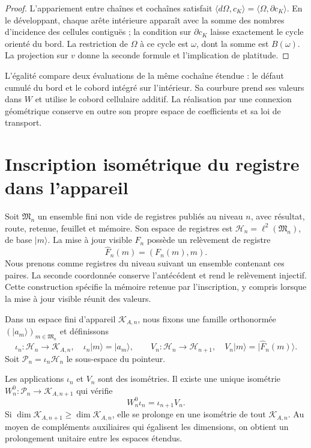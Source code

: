 \begin{proof}
L'appariement entre chaînes et cochaînes satisfait
\(\langle d\Omega,c_K\rangle=\langle\Omega,\partial c_K\rangle\).
En le développant, chaque arête intérieure apparaît avec la somme des nombres
d'incidence des cellules contiguës ; la condition sur
\(\partial c_K\) laisse exactement le cycle orienté du bord.
La restriction de \(\Omega\) à ce cycle est \(\omega\), dont la somme
est \(B(\omega)\). La projection sur \(v\) donne la seconde formule
et l'implication de platitude.
\end{proof}

L'égalité compare deux évaluations de la même cochaîne étendue : le défaut cumulé du bord et le cobord intégré sur l'intérieur. Sa courbure prend ses valeurs dans \(W\) et utilise le cobord cellulaire additif. La réalisation par une connexion géométrique conserve en outre son propre espace de coefficients et sa loi de transport.

\section{Inscription isométrique du registre dans l'appareil}
\label{x_reciprocidad:vii:sec:observador-aparato}

Soit \(\mathfrak M_n\) un ensemble fini non vide de registres
publiés au niveau \(n\), avec résultat, route, retenue, feuillet et mémoire.
Son espace de registres est
\(\mathcal H_n=\ell^2(\mathfrak M_n)\), de base \(|m\rangle\).
La mise à jour visible \(F_n\) possède un relèvement de registre
\[
 \widehat F_n(m)=(F_n(m),m).
\]
Nous prenons comme registres du niveau suivant un ensemble contenant ces paires. La seconde coordonnée conserve l'antécédent et rend le relèvement injectif. Cette construction spécifie la mémoire retenue par l'inscription, y compris lorsque la mise à jour visible réunit des valeurs.

Dans un espace fini d'appareil \(\mathcal K_{A,n}\), nous fixons une
famille orthonormée \((|a_m\rangle)_{m\in\mathfrak M_n}\) et définissons
\[
 \iota_n:\mathcal H_n\longrightarrow\mathcal K_{A,n},
 \quad \iota_n|m\rangle=|a_m\rangle,
 \qquad
 V_n:\mathcal H_n\longrightarrow\mathcal H_{n+1},
 \quad V_n|m\rangle=|\widehat F_n(m)\rangle.
\]
Soit \(\mathcal P_n=\iota_n\mathcal H_n\) le sous-espace du pointeur.

\begin{theorem}
\label{x_reciprocidad:vii:thm:observador-entrelazador}
Les applications \(\iota_n\) et \(V_n\) sont des isométries. Il existe une unique
isométrie \(W_n^0:\mathcal P_n\longrightarrow\mathcal K_{A,n+1}\)
qui vérifie
\begin{equation}
 W_n^0\iota_n=\iota_{n+1}V_n.
 \label{x_reciprocidad:vii:eq:observador-cuadrado}
\end{equation}
Si \(\dim\mathcal K_{A,n+1}\geq\dim\mathcal K_{A,n}\),
elle se prolonge en une isométrie de tout \(\mathcal K_{A,n}\).
Au moyen de compléments auxiliaires qui égalisent les dimensions, on obtient
un prolongement unitaire entre les espaces étendus.
\end{theorem}

